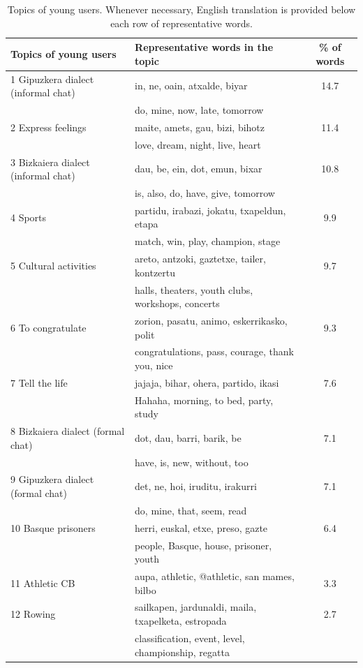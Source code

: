 \documentclass[information,article,submit,moreauthors,pdftex,10pt,a4paper]{Definitions/mdpi}
\begin{document}
\begin{table}[H]
  \centering
  \begin{tabular}{llc}
    \hline
    \textbf{Topics of young users} &  \textbf{Representative words in the topic} & \textbf{\% of words} \\ \hline \hline
                   1  Gipuzkera dialect (informal chat) & in, ne, oain, atxalde, biyar & 14.7 \\
                   & do, mine, now, late, tomorrow & \\ \hline
                   2  Express feelings & maite, amets, gau, bizi, bihotz & 11.4 \\
                   & love, dream, night, live, heart & \\ \hline
                   3  Bizkaiera dialect (informal chat) & dau, be, ein, dot, emun, bixar & 10.8 \\
                   & is, also, do, have, give, tomorrow & \\ \hline
                   4  Sports & partidu, irabazi, jokatu, txapeldun, etapa & 9.9 \\
                   & match, win, play, champion, stage & \\ \hline
                   5  Cultural activities & areto, antzoki, gaztetxe, tailer, kontzertu & 9.7 \\
                   & halls, theaters, youth clubs, workshops, concerts & \\ \hline
                   6  To congratulate & zorion, pasatu, animo, eskerrikasko, polit & 9.3 \\
                   & congratulations, pass, courage, thank you, nice & \\ \hline
                   7  Tell the life & jajaja, bihar, ohera, partido, ikasi & 7.6 \\
                   & Hahaha, morning, to bed, party, study & \\ \hline
                   8  Bizkaiera dialect (formal chat) & dot, dau, barri, barik, be & 7.1 \\
                   & have, is, new, without, too & \\ \hline
                   9  Gipuzkera dialect (formal chat) & det, ne, hoi, iruditu, irakurri  & 7.1 \\
                   & do, mine, that, seem, read & \\ \hline
                   10 Basque prisoners & herri, euskal, etxe, preso, gazte & 6.4 \\
                   & people, Basque, house, prisoner, youth & \\ \hline
                   11 Athletic CB & aupa, athletic, @athletic, san mames, bilbo  & 3.3 \\ \hline
                   12 Rowing & sailkapen, jardunaldi, maila, txapelketa, estropada & 2.7 \\
                   & classification, event, level, championship, regatta & \\ \hline
  \end{tabular}
  \caption{Topics of young users. Whenever necessary, English translation is provided below each row of representative words.}
  \label{tab:young-tp}
\end{table}
\end{document}

